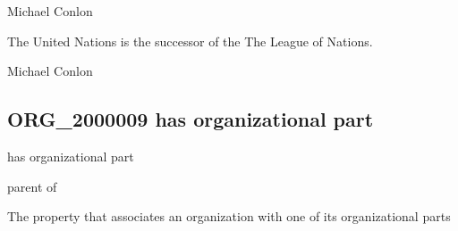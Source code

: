 \documentclass[letterpaper,10pt,english]{sphinxmanual}
\begin{document}
\begin{sphinxShadowBox}

\sphinxAtStartPar
Michael Conlon 
\end{sphinxShadowBox}

\begin{sphinxShadowBox}

\sphinxAtStartPar
The United Nations is the successor of the The League of Nations.
\end{sphinxShadowBox}

\begin{sphinxShadowBox}

\sphinxAtStartPar
Michael Conlon 
\end{sphinxShadowBox}
\begin{quote}

\ignorespaces \end{quote}


\subsection{ORG\_2000009 \sphinxhyphen{} has organizational part}
\label{\detokenize{doc-ORG_2000009:org-2000009-has-organizational-part}}\label{\detokenize{doc-ORG_2000009:index-0}}\label{\detokenize{doc-ORG_2000009::doc}}
\begin{sphinxShadowBox}

\sphinxAtStartPar
has organizational part
\end{sphinxShadowBox}

\begin{sphinxShadowBox}

\sphinxAtStartPar
parent of
\end{sphinxShadowBox}

\begin{sphinxShadowBox}

\sphinxAtStartPar
The property that associates an organization with one of its organizational parts
\end{sphinxShadowBox}
\end{document}
